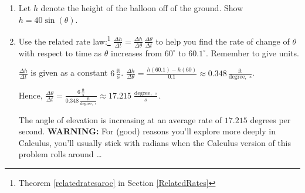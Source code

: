 \documentclass{ximera}
\begin{document}
\begin{question}
\begin{problem}
\begin{enumerate}

\item Let $h$ denote the height of the balloon off of the ground.  Show $h = 40 \sin(\theta)$.

\item Use the related rate law:\footnote{Theorem \ref{relatedratesaroc} in Section  \ref{RelatedRates}}  $\frac{\Delta h}{\Delta t} = \frac{\Delta h}{\Delta \theta} \, \frac{\Delta \theta}{\Delta t}$ to help you find the rate of change of $\theta$ with respect to time as $\theta$ increases from $60^{\circ}$ to $60.1^{\circ}$.  Remember to give units.

\begin{solution}

$\frac{\Delta h}{\Delta t}$ is given as a constant $6 \, \frac{\text{ft}}{\text{s}}$. $\frac{\Delta h}{\Delta \theta} = \frac{h(60.1) - h(60)}{0.1} \approx 0.348 \, \frac{\text{ft}}{\text{degree,  } \,  \circ}$.  

Hence, $\frac{\Delta \theta}{\Delta t} = \frac{ 6 \, \frac{\text{ft}}{\text{s}}   }{ 0.348 \, \frac{\text{ft}}{\text{degree,  } \, \circ}} \approx 17.215 \, \frac{ \text{degree,  } \, \circ}{s}$.  

The angle of elevation is increasing at an average rate of $17.215$ degrees  per second.  
\textbf{WARNING:} For (good) reasons you'll explore more deeply in Calculus, you'll usually stick with radians when the Calculus version of this problem rolls around \ldots 

\end{solution}
\end{enumerate}
\end{problem}

\end{question}
\end{document}
